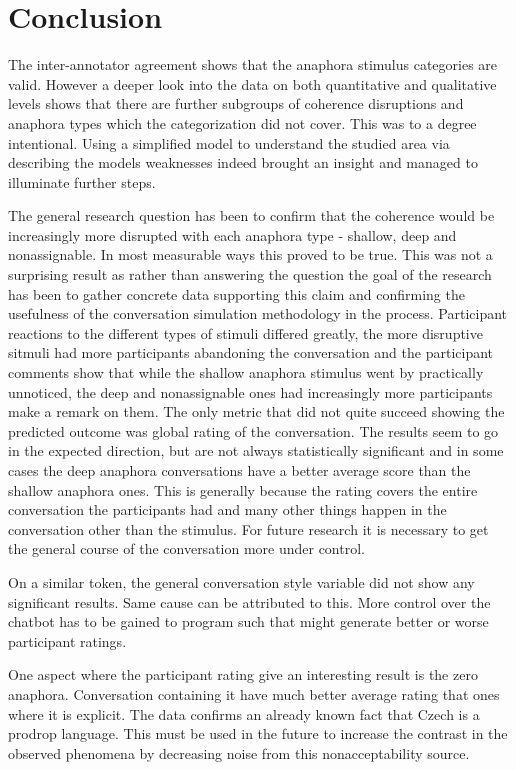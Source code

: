 \section{Conclusion}

The inter-annotator agreement shows that the anaphora stimulus categories are valid.
However a deeper look into the data on both quantitative and qualitative levels shows
that there are further subgroups of coherence disruptions and anaphora types
which the categorization did not cover.
This was to a degree intentional.
Using a simplified model to understand the studied area via describing the models weaknesses
indeed brought an insight and managed to illuminate further steps.

The general research question has been to confirm that the coherence would be increasingly more disrupted
with each anaphora type - shallow, deep and nonassignable.
In most measurable ways this proved to be true.
This was not a surprising result as rather than answering the question
the goal of the research has been to gather concrete data supporting this claim
and confirming the usefulness of the conversation simulation methodology in the process.
Participant reactions to the different types of stimuli differed greatly,
the more disruptive sitmuli had more participants abandoning the conversation and
the participant comments show that while the shallow anaphora stimulus went by practically unnoticed,
the deep and nonassignable ones had increasingly more participants make a remark on them.
The only metric that did not quite succeed showing the predicted outcome was global rating of the conversation.
The results seem to go in the expected direction, but are not always statistically significant and
in some cases the deep anaphora conversations have a better average score than the shallow anaphora ones.
This is generally because the rating covers the entire conversation the participants had
and many other things happen in the conversation other than the stimulus.
For future research it is necessary to get the general course of the conversation more under control.

On a similar token, the general conversation style variable did not show any significant results.
Same cause can be attributed to this.
More control over the chatbot has to be gained
to program such that might generate better or worse participant ratings.

One aspect where the participant rating give an interesting result is the zero anaphora.
Conversation containing it have much better average rating that ones where it is explicit.
The data confirms an already known fact that Czech is a prodrop language.
This must be used in the future to increase the contrast in the observed phenomena
by decreasing noise from this nonacceptability source.

